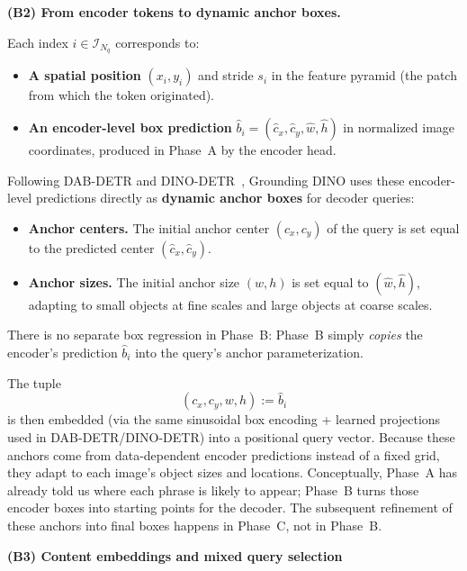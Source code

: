 \begin{enrichment}
\begin{enrichment}[Method][subsection]
		\medskip
		
		\noindent\textbf{(B2) From encoder tokens to dynamic anchor boxes.}
		
		Each index \(i \in \mathcal{I}_{N_q}\) corresponds to:
		\begin{itemize}
			\item \textbf{A spatial position} \((x_i, y_i)\) and stride \(s_i\) in the feature pyramid (the patch from which the token originated).
			\item \textbf{An encoder-level box prediction} \(\hat{b}_i = (\hat{c}_x,\hat{c}_y,\hat{w},\hat{h})\) in normalized image coordinates, produced in Phase~A by the encoder head.
		\end{itemize}
		Following DAB-DETR and DINO-DETR~\cite{liu2022_dab_detr,zhang2022_dino}, Grounding DINO uses these encoder-level predictions directly as \textbf{dynamic anchor boxes} for decoder queries:
		\begin{itemize}
			\item \textbf{Anchor centers.} The initial anchor center \((c_x,c_y)\) of the query is set equal to the predicted center \((\hat{c}_x,\hat{c}_y)\).
			\item \textbf{Anchor sizes.} The initial anchor size \((w,h)\) is set equal to \((\hat{w},\hat{h})\), adapting to small objects at fine scales and large objects at coarse scales.
		\end{itemize}
		There is no separate box regression in Phase~B: Phase~B simply \emph{copies} the encoder’s prediction \(\hat{b}_i\) into the query’s anchor parameterization. 
		
		\newpage
		
		The tuple
		\[
		(c_x,c_y,w,h) := \hat{b}_i
		\]
		is then embedded (via the same sinusoidal box encoding + learned projections used in DAB-DETR/DINO-DETR) into a positional query vector. Because these anchors come from data-dependent encoder predictions instead of a fixed grid, they adapt to each image’s object sizes and locations. Conceptually, Phase~A has already told us where each phrase is likely to appear; Phase~B turns those encoder boxes into starting points for the decoder. The subsequent refinement of these anchors into final boxes happens in Phase~C, not in Phase~B.
		
		\medskip
		
				\noindent\textbf{(B3) Content embeddings and mixed query selection}
		

\end{enrichment}
\end{enrichment}
